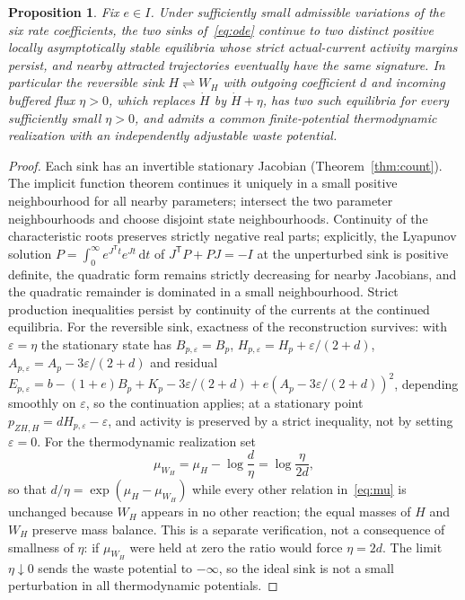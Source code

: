 \documentclass[11pt,a4paper]{article}
\theoremstyle{plain}
\newtheorem{proposition}[theorem]{Proposition}
\theoremstyle{definition}
\theoremstyle{remark}
\newcommand{\dd}{\,\mathrm{d}}
\newcommand{\ep}{\varepsilon}
\begin{document}
\begin{proposition}\label{prop:persist}
Fix $e\in I$. Under sufficiently small admissible variations of the six rate coefficients, the two sinks of~\eqref{eq:ode} continue to two distinct positive locally asymptotically stable equilibria whose strict actual-current activity margins persist, and nearby attracted trajectories eventually have the same signature. In particular the reversible sink $H\rightleftharpoons W_H$ with outgoing coefficient $d$ and incoming buffered flux $\eta>0$, which replaces $\dot H$ by $\dot H+\eta$, has two such equilibria for every sufficiently small $\eta>0$, and admits a common finite-potential thermodynamic realization with an independently adjustable waste potential.
\end{proposition}
\begin{proof}
Each sink has an invertible stationary Jacobian (Theorem~\ref{thm:count}). The implicit function theorem continues it uniquely in a small positive neighbourhood for all nearby parameters; intersect the two parameter neighbourhoods and choose disjoint state neighbourhoods. Continuity of the characteristic roots preserves strictly negative real parts; explicitly, the Lyapunov solution $P=\int_0^\infty e^{J^{\mathsf T}t}e^{Jt}\dd t$ of $J^{\mathsf T}P+PJ=-I$ at the unperturbed sink is positive definite, the quadratic form remains strictly decreasing for nearby Jacobians, and the quadratic remainder is dominated in a small neighbourhood. Strict production inequalities persist by continuity of the currents at the continued equilibria. For the reversible sink, exactness of the reconstruction survives: with $\ep=\eta$ the stationary state has $B_{p,\ep}=B_p$, $H_{p,\ep}=H_p+\ep/(2+d)$, $A_{p,\ep}=A_p-3\ep/(2+d)$ and residual $E_{p,\ep}=b-(1+e)B_p+K_p-3\ep/(2+d)+e(A_p-3\ep/(2+d))^2$, depending smoothly on $\ep$, so the continuation applies; at a stationary point $p_{ZH,H}=dH_{p,\ep}-\ep$, and activity is preserved by a strict inequality, not by setting $\ep=0$. For the thermodynamic realization set
\[
\mu_{W_H}=\mu_H-\log\frac d\eta=\log\frac{\eta}{2d} ,
\]
so that $d/\eta=\exp(\mu_H-\mu_{W_H})$ while every other relation in~\eqref{eq:mu} is unchanged because $W_H$ appears in no other reaction; the equal masses of $H$ and $W_H$ preserve mass balance. This is a separate verification, not a consequence of smallness of $\eta$: if $\mu_{W_H}$ were held at zero the ratio would force $\eta=2d$. The limit $\eta\downarrow0$ sends the waste potential to $-\infty$, so the ideal sink is not a small perturbation in all thermodynamic potentials.
\end{proof}
\end{document}
